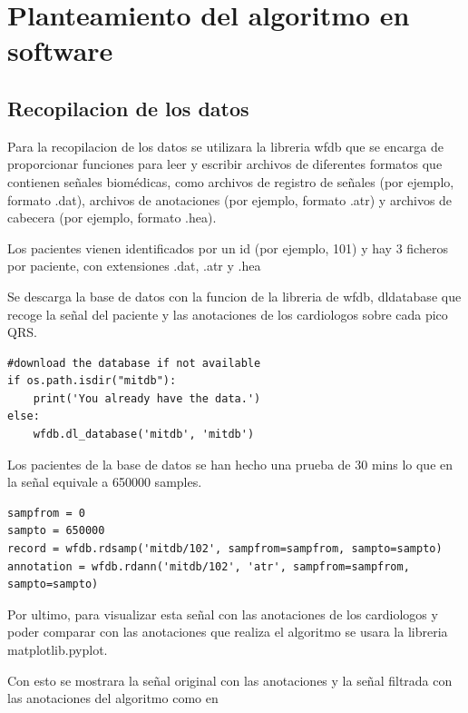 \chapter{Planteamiento del algoritmo en software}
\section{Recopilacion de los datos}
Para la recopilacion de los datos se utilizara la libreria wfdb que se encarga de proporcionar
funciones para leer y escribir archivos de diferentes formatos que contienen señales biomédicas,
como archivos de registro de señales (por ejemplo, formato .dat), archivos de anotaciones
 (por ejemplo, formato .atr) y archivos de cabecera (por ejemplo, formato .hea).

 Los pacientes vienen identificados por un id (por ejemplo, 101) y hay 3 ficheros por paciente, 
 con extensiones .dat, .atr y .hea

Se descarga la base de datos con la funcion de la libreria de wfdb, dldatabase que recoge 
la señal del paciente y las anotaciones de los cardiologos sobre cada pico QRS.


\lstset{language=python, breaklines=true, basicstyle=\footnotesize}
\begin{lstlisting}[frame=single]
#download the database if not available
if os.path.isdir("mitdb"):
	print('You already have the data.')
else:
	wfdb.dl_database('mitdb', 'mitdb')
\end{lstlisting}

Los pacientes de la base de datos se han hecho una prueba de 30 mins lo que en la señal 
equivale a 650000 samples.

\lstset{language=python, breaklines=true, basicstyle=\footnotesize}
\begin{lstlisting}[frame=single]
sampfrom = 0
sampto = 650000
record = wfdb.rdsamp('mitdb/102', sampfrom=sampfrom, sampto=sampto)
annotation = wfdb.rdann('mitdb/102', 'atr', sampfrom=sampfrom, sampto=sampto)
\end{lstlisting}

Por ultimo, para visualizar esta señal con las anotaciones de los cardiologos y poder comparar 
con las anotaciones que realiza el algoritmo se usara la libreria matplotlib.pyplot.

Con esto se mostrara la señal original con las anotaciones y la señal filtrada con las anotaciones
del algoritmo como en 

